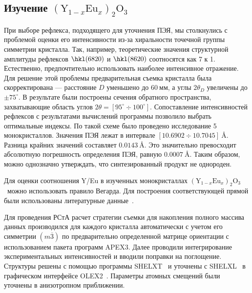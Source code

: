 \documentclass[a4paper,14pt]{extarticle}
\newcommand{\unit}[1]{ \ \text{#1}}
\newcommand{\degree}{^\circ}
\newcommand{\YEu}{${(\text{Y}_{1-x}\text{Eu}_x)}_2\text{O}_3$}
\newcommand{\range}[2]{[#1\div#2]}
\newcounter{x}
\begin{document}
\subsection{Изучение \YEu}
При выборе рефлекса, подходящего для уточнения ПЭЯ, мы столкнулись с проблемой оценки его интенсивности из-за хиральности точечной группы симметрии кристалла.
Так, например, теоретические значения структурной амплитуды рефлексов $\hkl(6 8 20)$ и $\hkl(8 6 20)$ соотносятся как 7 к 1.
Естественно, предпочтительно использовать наиболее интенсивное отражение.
Для решение этой проблемы предварительная съемка кристалла была скорректирована --- расстояние $D$ уменьшено до $60\unit{мм}$, а углы $2\theta_D$ увеличены до $\pm 75\degree$.
В результате были построены сечения обратного пространства, захватывающие область углов $2\theta = \range{95\degree}{100\degree}$.
Сопоставление интенсивностей рефлексов с результатами вычислений программы позволило выбрать оптимальные индексы.
По такой схеме было проведено исследование 5 монокристаллов.
Значения ПЭЯ лежат в интервале $\range{10.6902}{10.7045}\unit{\AA}$.
Разница крайних значений составляет $0.0143\unit{\AA}$.
Это значительно превосходит абсолютную погрешность определения ПЭЯ, равную $0.0007\unit{\AA}$.
Таким образом, можно однозначно утверждать, что синтезированный продукт не однороден.

Для оценки соотношения Y/Eu в изученных монокристаллах \YEu~можно использовать правило Вегарда.
Для построения соответствующей прямой были использованы литературные данные~\cite{Swanson:1954,Morris:1984}.

Для проведения РСтА расчет стратегии съемки для накопления полного массива данных производился для каждого кристалла автоматически с учетом его симметрии $(m\overline{3})$ по предварительно определенной матрице ориентации с использованием пакета программ APEX3.
Далее проводили интегрирование экспериментальных интенсивностей и вводили поправки на поглощение.
Структуры решены с помощью программы SHELXT~\cite{Sheldrick:2015:shelxt} и уточнены с SHELXL~\cite{Sheldrick:2015:shelxl} в графическом интерфейсе OLEX2~\cite{Dolomanov:2009}.
Параметры атомных смещений были уточнены в анизотропном приближении.
\end{document}
